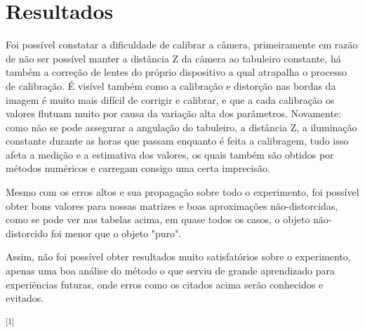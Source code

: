 \documentclass[conference,harvard,brazil,english]{sbatex}
\begin{document}
	\section{Resultados} 
			\par Foi possível constatar a dificuldade de calibrar a câmera, primeiramente em razão de não ser possível manter a distância Z da câmera ao tabuleiro constante, há também a correção de lentes do próprio dispositivo a qual atrapalha o processo de calibração. É visível também como a calibração e distorção nas bordas da imagem é muito mais difícil de corrigir e calibrar, e que a cada calibração os valores flutuam muito por causa da variação alta dos parâmetros. Novamente: como não se pode assegurar a angulação do tabuleiro, a distância Z, a iluminação constante durante as horas que passam enquanto é feita a calibragem, tudo isso afeta a medição e a estimativa dos valores, os quais também são obtidos por métodos numéricos e carregam consigo uma certa imprecisão.
			\par Mesmo com os erros altos e sua propagação sobre todo o experimento, foi possível obter bons valores para nossas matrizes e boas aproximações não-distorcidas, como se pode ver nas tabelas acima, em quase todos os casos, o objeto não-distorcido foi menor que o objeto "puro".
			\par Assim, não foi possível obter resultados muito satisfatórios sobre o experimento, apenas uma boa análise do método o que serviu de grande aprendizado para experiências futuras, onde erros como os citados acima serão conhecidos e evitados.

\textsuperscript{[1]}\cite{CalibraMiranda}
\cite{WikiCalibrate}
\end{document}
